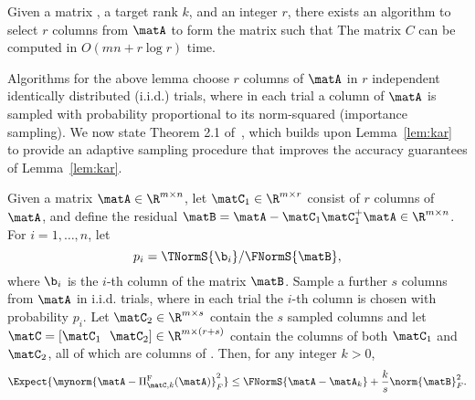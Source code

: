 \begin{lemma}\label{lem:kar}
Given a matrix , a target rank $k$, and an integer $r$, there exists an algorithm to select $r$ columns from $\matA$ to form the matrix  such that
The matrix $C$ can be computed in $O(mn + r\log r)$ time.
\end{lemma}

Algorithms for the above lemma
choose $r$ columns of $\matA$ in $r$ independent identically distributed (i.i.d.) trials, where in each trial a column of $\matA$ is sampled with probability proportional to its norm-squared (importance sampling). We now state Theorem 2.1 of~\cite{DRVW06}, which builds upon Lemma~\ref{lem:kar}
to provide an adaptive sampling procedure that improves the accuracy guarantees of Lemma~\ref{lem:kar}.
\begin{lemma}\label{oneround}
Given a matrix $\matA \in \R^{m \times n}$, let $\matC_1 \in \R^{m \times r}$ consist of $r$ columns of $\matA$,
and define the residual
 $\matB = \matA - \matC_1 \matC_1^+ \matA
\in \R^{m \times n}$. For $i=1,\ldots,n$, let
$$p_i = {\TNormS{\b_{i}}}/{\FNormS{\matB}},$$
where $\b_i$ is the $i$-th column of the matrix $\matB$. Sample a further
$s$ columns from $\matA$ in  i.i.d. trials, where in each trial the $i$-th column is chosen with probability $p_i$.
Let $\matC_2 \in \R^{m \times s}$ contain the $s$ sampled columns and let $\matC = [\matC_1\ \ \matC_2] \in \R^{m \times (r+s)}$ contain the columns of both $\matC_1$ and $\matC_2$, all of which are columns of
\math{\matA}.  Then, for any integer $k > 0$,
$$\Expect{ \mynorm{ \matA - \Pi_{\matC,k}^{\mathrm{F}}(\matA) }_F^2 } \le \FNormS{ \matA - \matA_k } + \frac{k}{s} \norm{\matB}_F^2.$$
\end{lemma}


